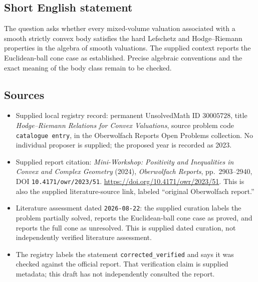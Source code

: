 \documentclass[11pt]{article}
\begin{document}
\subsection{Short English statement}
The question asks whether every mixed-volume valuation associated with a smooth strictly convex body satisfies the hard Lefschetz and Hodge--Riemann properties in the algebra of smooth valuations. The supplied context reports the Euclidean-ball cone case as established. Precise algebraic conventions and the exact meaning of the body class remain to be checked.
\subsection{Sources}
\begin{itemize}
\item Supplied local registry record: permanent UnsolvedMath ID \(30005728\), title \emph{Hodge--Riemann Relations for Convex Valuations}, source problem code \texttt{catalogue entry}, in the Oberwolfach Reports Open Problems collection. No individual proposer is supplied; the proposed year is recorded as 2023.
\item Supplied report citation: \emph{Mini-Workshop: Positivity and Inequalities in Convex and Complex Geometry} (2024), \emph{Oberwolfach Reports}, pp.\ 2903--2940, DOI \texttt{10.4171/owr/2023/51}. \url{https://doi.org/10.4171/owr/2023/51}. This is also the supplied literature-source link, labeled ``original Oberwolfach report.''
\item Literature assessment dated \texttt{2026-08-22}: the supplied curation labels the problem partially solved, reports the Euclidean-ball cone case as proved, and reports the full cone as unresolved. This is supplied dated curation, not independently verified literature assessment.
\item The registry labels the statement \texttt{corrected\_verified} and says it was checked against the official report. That verification claim is supplied metadata; this draft has not independently consulted the report.
\end{itemize}
\end{document}
